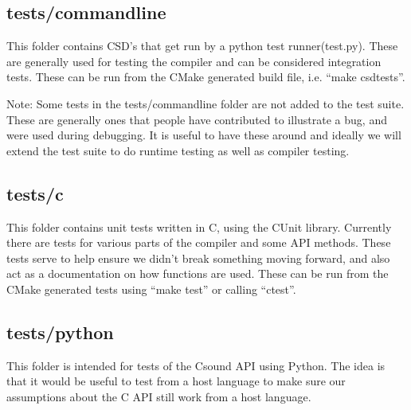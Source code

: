 \documentclass[]{book}
\begin{document}
\subsection{tests/commandline}

This folder contains CSD's that get run by a python test
runner(test.py). These are generally used for testing the compiler and
can be considered integration tests. These can be run from the CMake
generated build file, i.e. ``make csdtests''.

Note: Some tests in the tests/commandline folder are not added to the
test suite. These are generally ones that people have contributed to
illustrate a bug, and were used during debugging. It is useful to have
these around and ideally we will extend the test suite to do runtime
testing as well as compiler testing.

\subsection{tests/c}

This folder contains unit tests written in C, using the CUnit library.
Currently there are tests for various parts of the compiler and some API
methods. These tests serve to help ensure we didn't break something
moving forward, and also act as a documentation on how functions are
used. These can be run from the CMake generated tests using ``make
test'' or calling ``ctest''.

\subsection{tests/python}

This folder is intended for tests of the Csound API using Python. The
idea is that it would be useful to test from a host language to make
sure our assumptions about the C API still work from a host language.
\end{document}
